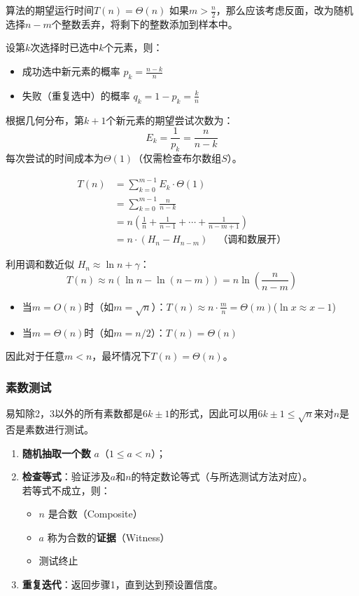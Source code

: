 \documentclass[./../main.tex]{subfiles} %
\begin{document}
算法的期望运行时间$T(n)=\Theta(n)$
如果$m>\frac{n}{2}$，那么应该考虑反面，改为随机选择$n-m$个整数丢弃，将剩下的整数添加到样本中。

设第$k$次选择时已选中$k$个元素，则：
\begin{itemize}
    \item 成功选中新元素的概率 $p_k = \frac{n-k}{n}$
    \item 失败（重复选中）的概率 $q_k = 1-p_k = \frac{k}{n}$
\end{itemize}

根据几何分布，第$k+1$个新元素的期望尝试次数为：
$$
E_k = \frac{1}{p_k} = \frac{n}{n-k}
$$
每次尝试的时间成本为$\Theta(1)$（仅需检查布尔数组$S$）。

$$
\begin{aligned}
T(n) &= \sum_{k=0}^{m-1} E_k \cdot \Theta(1) \\
     &= \sum_{k=0}^{m-1} \frac{n}{n-k} \\
     &= n \left( \frac{1}{n} + \frac{1}{n-1} + \cdots + \frac{1}{n-m+1} \right) \\
     &= n \cdot (H_n - H_{n-m}) \quad \text{（调和数展开）}
\end{aligned}
$$

利用调和数近似 $H_n \approx \ln n + \gamma$：
$$
T(n) \approx n \left( \ln n - \ln(n-m) \right) = n \ln\left(\frac{n}{n-m}\right)
$$
\begin{itemize}
    \item 当$m = O(n)$时（如$m=\sqrt{n}$）：$T(n) \approx n \cdot \frac{m}{n} = \Theta(m)$($\ln x\approx x - 1$)
    \item 当$m = \Theta(n)$时（如$m=n/2$）：$T(n) = \Theta(n)$
\end{itemize}

\noindent 因此对于任意$m<n$，最坏情况下$T(n) = \Theta(n)$。


\subsubsection{素数测试}
易知除2，3以外的所有素数都是$6k\pm1$的形式，因此可以用$6k\pm 1\le \sqrt{n}$来对$n$是否是素数进行测试。

\begin{enumerate}
    \item \textbf{随机抽取一个数} $a$（$1 \leq a < n$）；
    \item \textbf{检查等式}：验证涉及$a$和$n$的特定数论等式（与所选测试方法对应）。\\
    若等式不成立，则：
    \begin{itemize}
        \item $n$ 是合数（Composite）
        \item $a$ 称为合数的\textbf{证据}（Witness）
        \item 测试终止
    \end{itemize}
    \item \textbf{重复迭代}：返回步骤1，直到达到预设置信度。
\end{enumerate}
\end{document}
